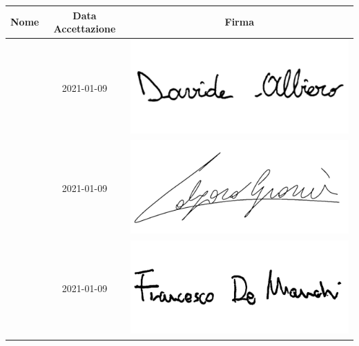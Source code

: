 \renewcommand{\arraystretch}{1}
	\begin{table}[H]
		\begin{center}
			\setlength{\aboverulesep}{0pt}
			\setlength{\belowrulesep}{0pt}
			\setlength{\extrarowheight}{.75ex}
			\begin{tabular}{ c c c}
				\rowcolor{AzzurroGruppo!30} 
				\textbf{Nome} & \textbf{Data Accettazione} & \textbf{Firma} \\
				\toprule
				
				\Davide{} & 2021-01-09 & \includegraphics[scale = 0.5]{components/img/firme_membri/firma-da.png} \\
				\Giosue{} & 2021-01-09 & \includegraphics[scale = 0.5]{components/img/firme_membri/firma-gc.png} \\
				\Francesco{} & 2021-01-09 & \includegraphics[scale = 0.16]{components/img/firme_membri/firma-fdm.png} \\

\end{tabular}
\end{center}
\end{table}
